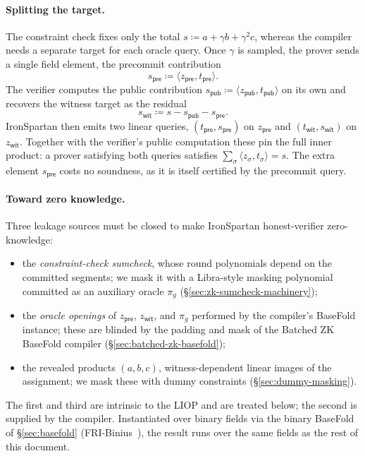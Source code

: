 \documentclass{article}
\theoremstyle{definition}
\begin{document}
\paragraph{Splitting the target.}
The constraint check fixes only the total $s \coloneqq a + \gamma b + \gamma^2 c$, whereas the compiler needs a separate target for each oracle query. Once $\gamma$ is sampled, the prover sends a single field element, the precommit contribution
\[
  s_{\textsf{pre}} \coloneqq \langle z_{\textsf{pre}}, t_{\textsf{pre}} \rangle.
\]
The verifier computes the public contribution $s_{\textsf{pub}} \coloneqq \langle z_{\textsf{pub}}, t_{\textsf{pub}} \rangle$ on its own and recovers the witness target as the residual
\[
  s_{\textsf{wit}} \coloneqq s - s_{\textsf{pub}} - s_{\textsf{pre}}.
\]
IronSpartan then emits two linear queries, $(t_{\textsf{pre}}, s_{\textsf{pre}})$ on $z_{\textsf{pre}}$ and $(t_{\textsf{wit}}, s_{\textsf{wit}})$ on $z_{\textsf{wit}}$. Together with the verifier's public computation these pin the full inner product: a prover satisfying both queries satisfies $\sum_\sigma \langle z_\sigma, t_\sigma \rangle = s$. The extra element $s_{\textsf{pre}}$ costs no soundness, as it is itself certified by the precommit query.

\paragraph{Toward zero knowledge.}
Three leakage sources must be closed to make IronSpartan honest-verifier zero-knowledge:
\begin{itemize}
\item the \emph{constraint-check sumcheck}, whose round polynomials depend on the committed segments; we mask it with a Libra-style masking polynomial committed as an auxiliary oracle $\pi_g$ (\S\ref{sec:zk-sumcheck-machinery});
\item the \emph{oracle openings} of $z_{\textsf{pre}}$, $z_{\textsf{wit}}$, and $\pi_g$ performed by the compiler's BaseFold instance; these are blinded by the padding and mask of the Batched ZK BaseFold compiler (\S\ref{sec:batched-zk-basefold});
\item the revealed products $(a, b, c)$, witness-dependent linear images of the assignment; we mask these with dummy constraints (\S\ref{sec:dummy-masking}).
\end{itemize}
The first and third are intrinsic to the LIOP and are treated below; the second is supplied by the compiler. Instantiated over binary fields via the binary BaseFold of \S\ref{sec:basefold} (FRI-Binius~\cite{Diamond:2025ab}), the result runs over the same fields as the rest of this document.
\end{document}

